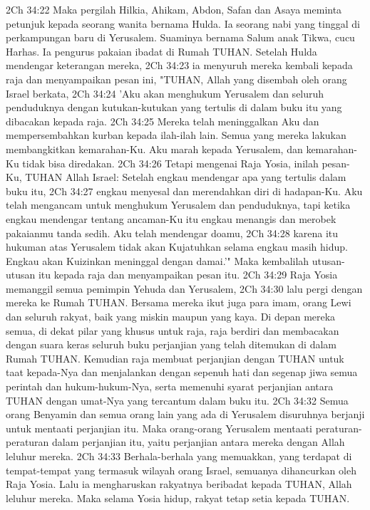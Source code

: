 2Ch 34:22  Maka pergilah Hilkia, Ahikam, Abdon, Safan dan Asaya meminta petunjuk kepada seorang wanita bernama Hulda. Ia seorang nabi yang tinggal di perkampungan baru di Yerusalem. Suaminya bernama Salum anak Tikwa, cucu Harhas. Ia pengurus pakaian ibadat di Rumah TUHAN. Setelah Hulda mendengar keterangan mereka,
2Ch 34:23  ia menyuruh mereka kembali kepada raja dan menyampaikan pesan ini, "TUHAN, Allah yang disembah oleh orang Israel berkata,
2Ch 34:24  'Aku akan menghukum Yerusalem dan seluruh penduduknya dengan kutukan-kutukan yang tertulis di dalam buku itu yang dibacakan kepada raja.
2Ch 34:25  Mereka telah meninggalkan Aku dan mempersembahkan kurban kepada ilah-ilah lain. Semua yang mereka lakukan membangkitkan kemarahan-Ku. Aku marah kepada Yerusalem, dan kemarahan-Ku tidak bisa diredakan.
2Ch 34:26  Tetapi mengenai Raja Yosia, inilah pesan-Ku, TUHAN Allah Israel: Setelah engkau mendengar apa yang tertulis dalam buku itu,
2Ch 34:27  engkau menyesal dan merendahkan diri di hadapan-Ku. Aku telah mengancam untuk menghukum Yerusalem dan penduduknya, tapi ketika engkau mendengar tentang ancaman-Ku itu engkau menangis dan merobek pakaianmu tanda sedih. Aku telah mendengar doamu,
2Ch 34:28  karena itu hukuman atas Yerusalem tidak akan Kujatuhkan selama engkau masih hidup. Engkau akan Kuizinkan meninggal dengan damai.'" Maka kembalilah utusan-utusan itu kepada raja dan menyampaikan pesan itu.
2Ch 34:29  Raja Yosia memanggil semua pemimpin Yehuda dan Yerusalem,
2Ch 34:30  lalu pergi dengan mereka ke Rumah TUHAN. Bersama mereka ikut juga para imam, orang Lewi dan seluruh rakyat, baik yang miskin maupun yang kaya. Di depan mereka semua, di dekat pilar yang khusus untuk raja, raja berdiri dan membacakan dengan suara keras seluruh buku perjanjian yang telah ditemukan di dalam Rumah TUHAN. Kemudian raja membuat perjanjian dengan TUHAN untuk taat kepada-Nya dan menjalankan dengan sepenuh hati dan segenap jiwa semua perintah dan hukum-hukum-Nya, serta memenuhi syarat perjanjian antara TUHAN dengan umat-Nya yang tercantum dalam buku itu.
2Ch 34:32  Semua orang Benyamin dan semua orang lain yang ada di Yerusalem disuruhnya berjanji untuk mentaati perjanjian itu. Maka orang-orang Yerusalem mentaati peraturan-peraturan dalam perjanjian itu, yaitu perjanjian antara mereka dengan Allah leluhur mereka.
2Ch 34:33  Berhala-berhala yang memuakkan, yang terdapat di tempat-tempat yang termasuk wilayah orang Israel, semuanya dihancurkan oleh Raja Yosia. Lalu ia mengharuskan rakyatnya beribadat kepada TUHAN, Allah leluhur mereka. Maka selama Yosia hidup, rakyat tetap setia kepada TUHAN.
